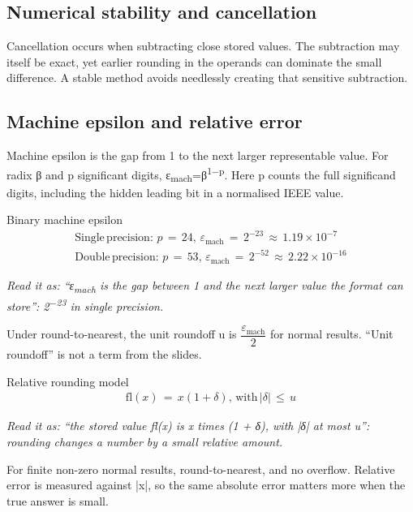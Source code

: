 \documentclass[11pt]{article}
\begin{document}
\begin{keepsection}
\begin{keepsection}
\subsection{Numerical stability and cancellation}

Cancellation occurs when subtracting close stored values. The subtraction may itself be exact, yet earlier rounding in the operands can dominate the small difference. A stable method avoids needlessly creating that sensitive subtraction.
\end{keepsection}

\begin{keepsection}
\subsection{Machine epsilon and relative error}

Machine epsilon is the gap from 1 to the next larger representable value. For radix β and p significant digits, ε\textsubscript{mach}=β\textsuperscript{1\ensuremath{-}p}. Here p counts the full significand digits, including the hidden leading bit in a normalised IEEE value.

\begin{equationcard}{Binary machine epsilon}
\[ \begin{gathered} \text{Single}\, \text{precision}:\, {p}\, =\, 24,\, ε_{\text{mach}}\, =\, 2^{-23}\, \approx \, 1.19\times 10^{-7} \\ \text{Double}\, \text{precision}:\, {p}\, =\, 53,\, ε_{\text{mach}}\, =\, 2^{-52}\, \approx \, 2.22\times 10^{-16} \end{gathered} \]
{\small \emph{Read it as: “ε\textsubscript{mach} is the gap between 1 and the next larger value the format can store”: 2\textsuperscript{\ensuremath{-}23} in single precision.}\par Under round-to-nearest, the unit roundoff u is {\small\ensuremath{\dfrac{ε_{\text{mach}}}{2}}} for normal results. “Unit roundoff” is not a term from the slides.}
\end{equationcard}

\begin{equationcard}{Relative rounding model}
\[ \begin{gathered} \text{fl}({x})\, =\, {x}(1+δ),\, \text{with}\, |δ|\, \leq \, {u} \end{gathered} \]
{\small \emph{Read it as: “the stored value fl(x) is x times (1 + δ), with |δ| at most u”: rounding changes a number by a small relative amount.}\par For finite non-zero normal results, round-to-nearest, and no overflow. Relative error is measured against |x|, so the same absolute error matters more when the true answer is small.}
\end{equationcard}


\end{keepsection}
\end{keepsection}
\end{document}
